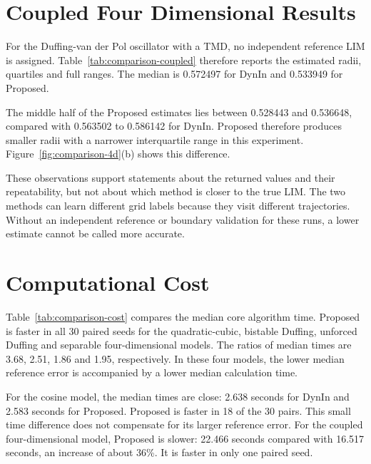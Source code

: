 \section{Coupled Four Dimensional Results}



For the Duffing-van der Pol oscillator with a TMD, no independent reference LIM is assigned. Table~\ref{tab:comparison-coupled} therefore reports the estimated radii, quartiles and full ranges. The median is 0.572497 for DynIn and 0.533949 for Proposed.

The middle half of the Proposed estimates lies between 0.528443 and 0.536648, compared with 0.563502 to 0.586142 for DynIn. Proposed therefore produces smaller radii with a narrower interquartile range in this experiment. Figure~\ref{fig:comparison-4d}(b) shows this difference.

These observations support statements about the returned values and their repeatability, but not about which method is closer to the true LIM. The two methods can learn different grid labels because they visit different trajectories. Without an independent reference or boundary validation for these runs, a lower estimate cannot be called more accurate.


\section{Computational Cost}



Table~\ref{tab:comparison-cost} compares the median core algorithm time. Proposed is faster in all 30 paired seeds for the quadratic-cubic, bistable Duffing, unforced Duffing and separable four-dimensional models. The ratios of median times are 3.68, 2.51, 1.86 and 1.95, respectively. In these four models, the lower median reference error is accompanied by a lower median calculation time.

For the cosine model, the median times are close: 2.638 seconds for DynIn and 2.583 seconds for Proposed. Proposed is faster in 18 of the 30 pairs. This small time difference does not compensate for its larger reference error. For the coupled four-dimensional model, Proposed is slower: 22.466 seconds compared with 16.517 seconds, an increase of about 36\%. It is faster in only one paired seed.

